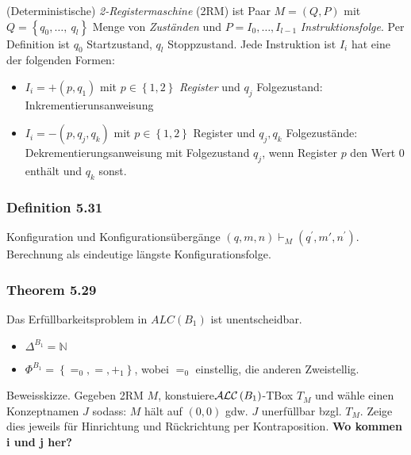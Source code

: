 (Deterministische) \emph{2-Registermaschine} (2RM) ist Paar
$M = \left( Q,P \right)$ mit
$Q = \left\{ q_{0},\ldots,\ q_{l} \right\}$ Menge von \emph{Zuständen}
und $P = I_{0},\ldots,I_{l - 1}$ \emph{Instruktionsfolge}. Per
Definition ist $q_{0}$ Startzustand, $q_{l}$ Stoppzustand. Jede
Instruktion ist $I_{i}$ hat eine der folgenden Formen:

\begin{itemize}
\item
  $I_{i} = + (p,q_{1})$ mit $p \in \left\{ 1,2 \right\}$
  \emph{Register} und $q_{j}$ Folgezustand: Inkrementierunsanweisung
\item
  $I_{i} = - (p,q_{j},q_{k})$ mit $p \in \left\{ 1,2 \right\}$
  Register und $q_{j},q_{k}$ Folgezustände: Dekrementierungsanweisung
  mit Folgezustand $q_{j}$, wenn Register $p$ den Wert $0$ enthält
  und $q_{k}$ sonst.
\end{itemize}

\subsubsection{Definition 5.31}\label{definition-5.31}

Konfiguration und Konfigurationsübergänge
$\left( q,m,n \right) \vdash_{M}(q^{'},m',n^{'})$. Berechnung als
eindeutige längste Konfigurationsfolge.

\subsubsection{Theorem 5.29}\label{theorem-5.29}

Das Erfüllbarkeitsproblem in $ALC(B_{1})$ ist unentscheidbar.

\begin{itemize}
\item
  $\Delta^{B_{1}}\mathbb{= N}$
\item
  $\Phi^{B_{1}} = \left\{ =_{0}, = , +_{1} \right\}$, wobei $=_{0}$
  einstellig, die anderen Zweistellig.
\end{itemize}

Beweisskizze. Gegeben 2RM $M$,
konstuiere$\text {$\mathcal{A}\mathcal{L}\mathcal{C}$}\left( B_{1} \right)$-TBox $T_{M}$ und wähle
einen Konzeptnamen $J$ sodass: $M$ hält auf $\left( 0,0 \right)$
gdw. $J$ unerfüllbar bzgl. $T_{M}$. Zeige dies jeweils für
Hinrichtung und Rückrichtung per Kontraposition. \textbf{Wo kommen i und
j her?}
